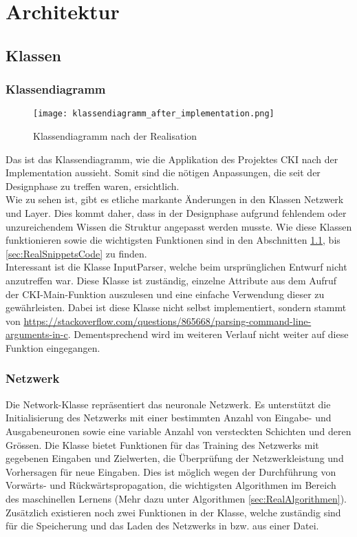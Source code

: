 \section{Architektur}
\label{sec:RealArchitektur}
\subsection{Klassen}
\label{sec:RealKlassen}
\subsubsection{Klassendiagramm}
\label{sec:RealKlassendiagramm}
\begin{figure}[H]
	\centering
		\texttt{[image: klassendiagramm\_after\_implementation.png]}
		\caption{Klassendiagramm nach der Realisation}
	\label{fig:klassendiagramm after implementation}
\end{figure}
Das ist das Klassendiagramm, wie die Applikation des Projektes CKI nach der Implementation aussieht. Somit sind die nötigen Anpassungen, die seit der Designphase zu treffen waren, ersichtlich.
\\
Wie zu sehen ist, gibt es etliche markante Änderungen in den Klassen Netzwerk und Layer. Dies kommt daher, dass in der Designphase aufgrund fehlendem oder unzureichendem Wissen die Struktur angepasst werden musste. Wie diese Klassen funktionieren sowie die wichtigsten Funktionen sind in den Abschnitten \ref{sec:RealKlassen}, bis \ref{sec:RealSnippetsCode} zu finden. 
\\
Interessant ist die Klasse InputParser, welche beim ursprünglichen Entwurf nicht anzutreffen war. Diese Klasse ist zuständig, einzelne Attribute aus dem Aufruf der CKI-Main-Funktion auszulesen und eine einfache Verwendung dieser zu gewährleisten. Dabei ist diese Klasse nicht selbst implementiert, sondern stammt von \url{https://stackoverflow.com/questions/865668/parsing-command-line-arguments-in-c}. Dementsprechend wird im weiteren Verlauf nicht weiter auf diese Funktion eingegangen.

\subsubsection{Netzwerk}
\label{sec:RealNetzwerk}
Die Network-Klasse repräsentiert das neuronale Netzwerk. Es unterstützt die Initialisierung des Netzwerks mit einer bestimmten Anzahl von Eingabe- und Ausgabeneuronen sowie eine variable Anzahl von versteckten Schichten und deren Grössen. Die Klasse bietet Funktionen für das Training des Netzwerks mit gegebenen Eingaben und Zielwerten, die Überprüfung der Netzwerkleistung und Vorhersagen für neue Eingaben. Dies ist möglich wegen der Durchführung von Vorwärts- und Rückwärtspropagation, die wichtigsten Algorithmen im Bereich des maschinellen Lernens (Mehr dazu unter Algorithmen \ref{sec:RealAlgorithmen}).
\\
Zusätzlich existieren noch zwei Funktionen in der Klasse, welche zuständig sind für die Speicherung und das Laden des Netzwerks in bzw. aus einer Datei.

